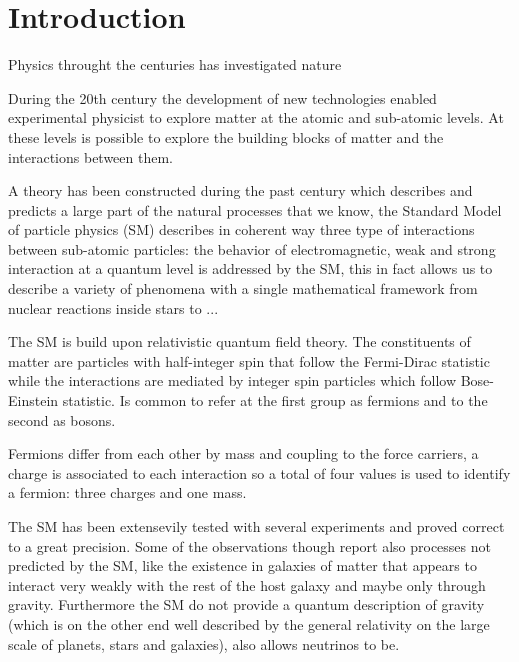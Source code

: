 \section{Introduction}
\label{sec:introduction}

Physics throught the centuries has investigated nature

During the 20th century the development of new technologies enabled experimental
physicist to explore matter at the atomic and sub-atomic levels. At these levels
is possible to explore the building blocks of matter and the interactions between them.

A theory has been constructed during the past century which describes and predicts
a large part of the natural processes that we know, the Standard Model of particle physics (SM)
describes in coherent way three type of interactions between sub-atomic particles:
the behavior of electromagnetic, weak and strong interaction at a quantum level is
addressed by the SM, this in fact allows us to describe a variety of phenomena with a
single mathematical framework from nuclear reactions inside stars to ...

The SM is build upon relativistic quantum field theory. The constituents of matter are particles
with half-integer spin that follow the Fermi-Dirac statistic while the interactions are mediated by
integer spin particles which follow Bose-Einstein statistic. Is common to refer at the first group as
fermions and to the second as bosons.

Fermions differ from each other by mass and coupling to the force carriers, a charge is associated
to each interaction so a total of four values is used to identify a fermion: three charges and one mass.


The SM has been extensevily tested with several experiments and proved correct to a great
precision. Some of the observations though report also processes not predicted by the SM,
like the existence in galaxies of matter that appears to interact very weakly with
the rest of the host galaxy and maybe only through gravity.
Furthermore the SM do not provide a quantum description of gravity (which is on the other end well
described by the general relativity on the large scale of planets, stars and galaxies), also allows
neutrinos to be.
